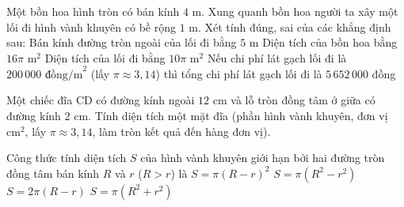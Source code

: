\begin{ex}%
	Một bồn hoa hình tròn có bán kính $4\text{ m}$. Xung quanh bồn hoa người ta xây một lối đi hình vành khuyên có bề rộng $1\text{ m}$. Xét tính đúng, sai của các khẳng định sau:
	\choiceTF
	{\True Bán kính đường tròn ngoài của lối đi bằng $5\text{ m}$}
	{\True Diện tích của bồn hoa bằng $16\pi\text{ m}^2$}
	{Diện tích của lối đi bằng $10\pi\text{ m}^2$}
	{\True Nếu chi phí lát gạch lối đi là $200\,000\text{ đồng/m}^2$ (lấy $\pi \approx 3{,}14$) thì tổng chi phí lát gạch lối đi là $5\,652\,000$ đồng}
\end{ex}

\begin{bt}%
	Một chiếc đĩa CD có đường kính ngoài $12\text{ cm}$ và lỗ tròn đồng tâm ở giữa có đường kính $2\text{ cm}$. Tính diện tích một mặt đĩa (phần hình vành khuyên, đơn vị $\text{cm}^2$, lấy $\pi \approx 3{,}14$, làm tròn kết quả đến hàng đơn vị).
\end{bt}

\begin{ex}%
	Công thức tính diện tích $S$ của hình vành khuyên giới hạn bởi hai đường tròn đồng tâm bán kính $R$ và $r$ ($R > r$) là
	\choice
	{$S = \pi(R - r)^2$}
	{\True $S = \pi(R^2 - r^2)$}
	{$S = 2\pi(R - r)$}
	{$S = \pi(R^2 + r^2)$}
\end{ex}

